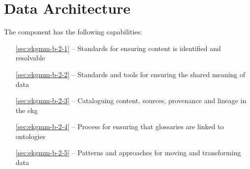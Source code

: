 \chapter{Data Architecture}\label{ch:ekgmm-b-2} %

The  component has the following capabilities:

\begin{itemize}[leftmargin=.5in]
  \item [\ref{sec:ekgmm-b-2-1}]  -- Standards for ensuring content is identified and resolvable
  \item [\ref{sec:ekgmm-b-2-2}]  -- Standards and tools for ensuring the shared meaning of data
  \item [\ref{sec:ekgmm-b-2-3}]  -- Cataloguing content, sources, provenance and lineage in the \gls{ekg}
  \item [\ref{sec:ekgmm-b-2-4}]  -- Process for ensuring that glossaries are linked to ontologies
  \item [\ref{sec:ekgmm-b-2-5}]  -- Patterns and approaches for moving and transforming data
\end{itemize}








